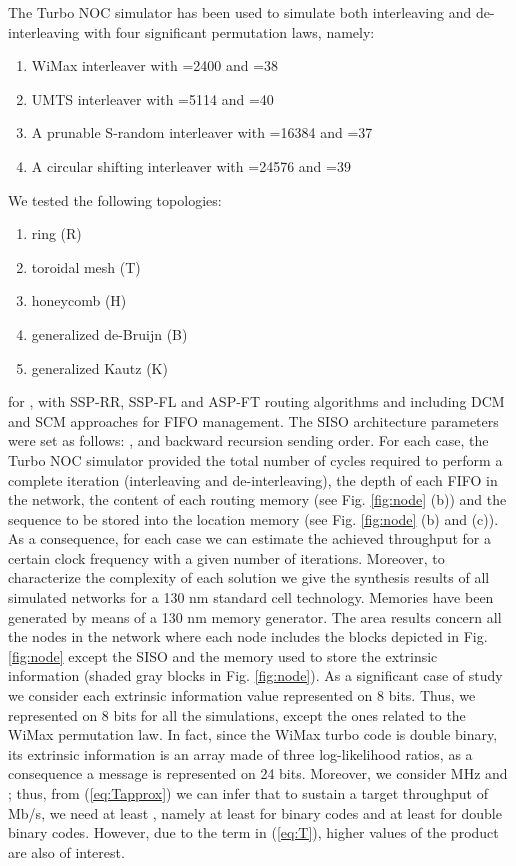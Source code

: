 \documentclass[10pt,twocolumn,journal]{IEEEtran}
\begin{document}
The Turbo NOC simulator has been used to simulate both interleaving and de-interleaving with four significant 
permutation laws, namely:
\begin{enumerate}
\item WiMax interleaver with =2400 and =38
\item UMTS interleaver with =5114 and =40
\item A prunable S-random interleaver \cite{dinoi_TCom05} with =16384 and =37
\item A circular shifting interleaver \cite{dolinar_TDA95} with =24576 and =39 \end{enumerate}
We tested the following topologies:
\begin{enumerate}
\item ring (R)
\item toroidal mesh (T)
\item honeycomb (H)
\item generalized de-Bruijn (B)
\item generalized Kautz (K)
\end{enumerate}
for , with SSP-RR, SSP-FL and ASP-FT routing algorithms and including DCM and SCM 
approaches for FIFO management. The SISO architecture parameters were set as follows:
,  and backward recursion sending order.
For each case, the Turbo NOC simulator provided the total number of cycles required to perform a complete iteration
(interleaving and de-interleaving), the depth of each FIFO in the network, the content of each routing memory 
(see Fig. \ref{fig:node} (b)) and the  sequence to be stored into the location memory 
(see Fig. \ref{fig:node} (b) and (c)). 
As a consequence, for each case we can estimate the achieved throughput for a certain clock frequency with a given 
number of iterations. Moreover, to characterize the complexity of each solution we give the synthesis results of 
all simulated networks for a 130 nm 
standard cell technology. Memories have been generated by means of a 130 nm memory generator. The area results concern  
all the nodes in the network where each node includes the blocks depicted in Fig. \ref{fig:node} except the SISO 
and the memory used to store the extrinsic information (shaded gray blocks in Fig. \ref{fig:node}).
As a significant case of study we consider each extrinsic information value represented on 8 bits. 
Thus, we represented  on 8 bits for all the simulations, except the 
ones related to the WiMax permutation law. In fact, since the WiMax turbo code is double binary, its extrinsic information 
is an array made of three log-likelihood ratios, as a consequence a message is represented on 24 bits. 
Moreover, we consider  MHz and ; thus, from (\ref{eq:Tapprox}) we can infer that to sustain 
a target throughput of  Mb/s, we need at least , 
namely at least  
for binary codes and 
at least  for double binary codes. However, due to the  term in (\ref{eq:T}), higher values 
of the  product are also of interest. 
\end{document}
